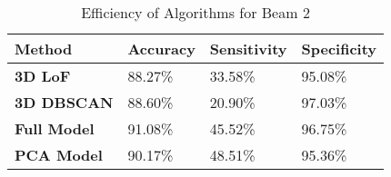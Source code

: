 \begin{table}[H]
	\centering
\caption[Beam 2 Results]{Summary of Results for Beam 2}
\label{tab::Beam2_results}
\end{table}

\begin{table}[H]
	\centering 
	\begin{tabular}{|l|l|l|l|}
		\hline
		\textbf{Method}     & \textbf{Accuracy} & \textbf{Sensitivity} & \textbf{Specificity} \\ \hline
		\textbf{3D LoF}     & 88.27\%           & 33.58\%              & 95.08\%              \\ \hline
		\textbf{3D DBSCAN}  & 88.60\%           & 20.90\%              & 97.03\%              \\ \hline
		\textbf{Full Model} & 91.08\%           & 45.52\%              & 96.75\%              \\ \hline
		\textbf{PCA Model}  & 90.17\%           & 48.51\%              & 95.36\%              \\ \hline
	\end{tabular}
\caption[Beam 2 Efficiency Metrics]{Efficiency of Algorithms for Beam 2}
\label{tab::Beam2_efficiency}
\end{table}

